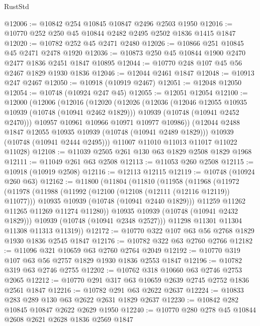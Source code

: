 \begin{lexlean}{RustStd}
\begin{coremodule}
@12006 := @10842 @254 @10845 @10847 @2496 @2503 @1950
@12016 := @10770 @252 @250 @45 @10844 @2482 @2495 @2502 @1836 @1415 @1847
@12020 := @10782 @252 @45 @2471 @2480
@12026 := @10866 @251 @10845 @45 @2471 @2478 @1920
@12036 := @10873 @250 @45 @10844 @1900 @2470 @2477 @1836 @2451 @1847 @10895
@12044 := @10770 @248 @107 @45 @56 @2467 @1829 @1930 @1836
@12046 := @12044 @2461 @1847
@12048 := @10913 @247 @2467
@12050 := @10918 (@10919 @2467)
@12051 := @12048 @12050
@12054 := @10748 (@10924 @247 @45)
@12055 := @12051 @12054
@12100 := @12000
    (@12006
      (@12016
        (@12020
          (@12026
            (@12036
              (@12046 @12055 @10935 @10939 (@10748 (@10941 @2462 @1829)))
              @10939
              (@10748 (@10941 @2452 @2470)))
            @10957
            @10961
            @10966
            @10971
            @10977
            @10986))
        (@12044 @2488 @1847 @12055 @10935 @10939 (@10748 (@10941 @2489 @1829)))
        @10939
        (@10748 (@10941 @2444 @2495)))
      @11007
      @11010
      @11013
      @11017
      @11022
      @11028)
@12108 := @11039 @2505 @261 @130 @63 @1829 @2508 @1829 @1968
@12111 := @11049 @261 @63 @2508
@12113 := @11053 @260 @2508
@12115 := @10918 (@10919 @2508)
@12116 := @12113 @12115
@12119 := @10748 (@10924 @260 @63)
@12162 := @11800
    (@11804
      (@11810
        (@11958
          (@11968
            (@11972
              (@11978
                (@11988
                  (@11992 (@12100 (@12108 (@12111 (@12116 @12119)) @11077)))
                  @10935
                  @10939
                  (@10748 (@10941 @2440 @1829)))
                @11259
                @11262
                @11265
                @11269
                @11274
                @11280))
            @10935
            @10939
            (@10748 (@10941 @2432 @1829)))
          @10939
          (@10748 (@10941 @2348 @2527)))
        @11298
        @11301
        @11304
        @11308
        @11313
        @11319))
@12172 := @10770 @322 @107 @63 @56 @2768 @1829 @1930 @1836 @2545 @1847
@12176 := @10782 @322 @63 @2760 @2766
@12182 := @11096 @321 @10659 @63 @2760 @2764 @2049
@12192 := @10770 @319 @107 @63 @56 @2757 @1829 @1930 @1836 @2553 @1847
@12196 := @10782 @319 @63 @2746 @2755
@12202 := @10762 @318 @10660 @63 @2746 @2753 @2065
@12212 := @10770 @291 @317 @63 @10659 @2639 @2745 @2752 @1836 @2561 @1847
@12216 := @10782 @291 @63 @2622 @2637
@12224 := @10833 @283 @289 @130 @63 @2622 @2631 @1829 @2637
@12230 := @10842 @282 @10845 @10847 @2622 @2629 @1950
@12240 := @10770 @280 @278 @45 @10844 @2608 @2621 @2628 @1836 @2569 @1847

\end{coremodule}
\end{lexlean}
